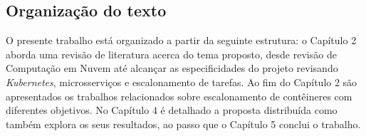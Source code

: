 \newpage
\subsection{Organização do texto}
O presente trabalho está organizado a partir da seguinte estrutura: o Capítulo 2 aborda uma revisão de literatura acerca do tema proposto, desde revisão de Computação em Nuvem até alcançar as especificidades do projeto revisando \textit{Kubernetes}, microsserviços e escalonamento de tarefas. Ao fim do Capítulo 2 são apresentados os trabalhos relacionados sobre escalonamento de contêineres com diferentes objetivos. No Capítulo 4 é detalhado a proposta distribuída como também explora os seus resultados, ao passo que o Capítulo 5 conclui o trabalho.